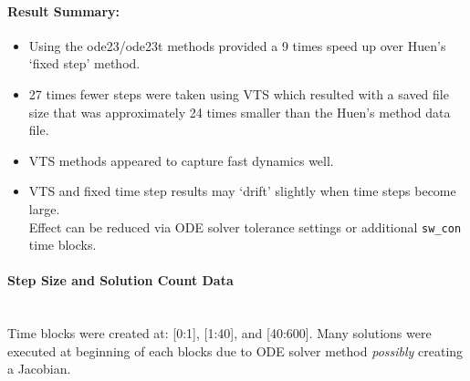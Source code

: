 \documentclass[12pt]{article}
\begin{document}
\paragraph{Result Summary:}
\begin{itemize}
\item Using the ode23/ode23t methods provided a 9 times speed up over Huen's `fixed step' method.
\item  27 times fewer steps were taken using VTS which resulted with a saved file size that was approximately 24 times smaller than the Huen's method data file.
\item VTS methods appeared to capture fast dynamics well. 
\item VTS and fixed time step results  may `drift' slightly when time steps become large. \\ Effect can be reduced via ODE solver tolerance settings or additional \verb|sw_con| time blocks.

\end{itemize}
\begin{table}[!ht]
\end{table}

\pagebreak
\paragraph{Step Size and Solution Count Data} \ \\
Time blocks were created at: [0:1], [1:40], and [40:600].
Many solutions were executed at beginning of each blocks due to ODE solver method \emph{possibly} creating a Jacobian.\\
\end{document}
